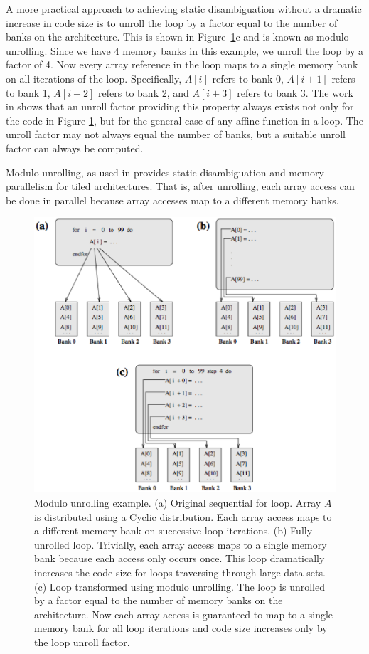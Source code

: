 A more practical approach to achieving static disambiguation without a dramatic increase in code size is to unroll the loop by a factor equal to the number of banks on the architecture. This is shown in Figure~\ref{modulo_unrolling}c and is known as modulo unrolling. Since we have 4 memory banks in this example, we unroll the loop by a factor of 4. Now every array reference in the loop maps to a single memory bank on all iterations of the loop. Specifically, $A[i]$ refers to bank 0, $A[i+1]$ refers to bank 1, $A[i+2]$ refers to bank 2, and $A[i+3]$ refers to bank 3. The work in \cite{barua1999maps} shows that an unroll factor providing this property always exists not only for the code in Figure \ref{modulo_unrolling}, but for the general case of any affine function in a loop.  The unroll factor may not always equal the number of banks, but a suitable unroll factor can always be computed.

Modulo unrolling, as used in \cite{barua1999maps} provides static disambiguation and memory parallelism for tiled architectures. That is, after unrolling, each array access can be done in parallel because array accesses map to a different memory banks. 

\begin{figure}
\begin{center}
\includegraphics[scale=0.45]{./Figures/modulo_unrolling.eps}
\caption{Modulo unrolling example. (a) Original sequential for loop. Array $A$ is distributed using a Cyclic distribution. Each array access maps to a different memory bank on successive loop iterations. (b) Fully unrolled loop. Trivially, each array access maps to a single memory bank because each access only occurs once. This loop dramatically increases the code size for loops traversing through large data sets. (c) Loop transformed using modulo unrolling. The loop is unrolled by a factor equal to the number of memory banks on the architecture. Now each array access is guaranteed to map to a single memory bank for all loop iterations and code size increases only by the loop unroll factor.}
\label{modulo_unrolling}
\end{center}
\end{figure}